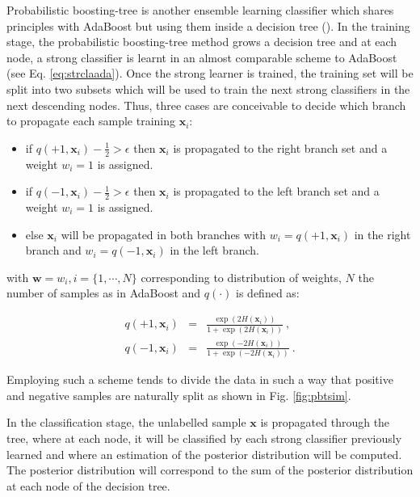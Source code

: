 \begin{enumerate}[leftmargin=*]
Probabilistic boosting-tree is another ensemble learning classifier which shares principles with AdaBoost but using them inside a decision tree (\cite{Tu2005}). In the training stage, the probabilistic boosting-tree method grows a decision tree and at each node, a strong classifier is learnt in an almost comparable scheme to AdaBoost (see Eq. \ref{eq:strclaada}). Once the strong learner is trained, the training set will be split into two subsets which will be used to train the next strong classifiers in the next descending nodes. Thus, three cases are conceivable to decide which branch to propagate each sample training $\mathbf{x}_i$:
\begin{itemize}
	\item if $q(+1, \mathbf{x}_i) - \frac{1}{2} > \epsilon$ then $\mathbf{x}_i$ is propagated to the right branch set and a weight $w_i=1$ is assigned. 
	\item if $q(-1, \mathbf{x}_i) - \frac{1}{2} > \epsilon$ then $\mathbf{x}_i$ is propagated to the left branch set and a weight $w_i=1$ is assigned.
	\item else $\mathbf{x}_i$ will be propagated in both branches with $w_i=q(+1, \mathbf{x}_i)$ in the right branch and $w_i=q(-1, \mathbf{x}_i)$ in the left branch.
\end{itemize}

\noindent with $\mathbf{w} = w_i, i=\{1,\cdots,N\}$ corresponding to distribution of weights, $N$ the number of samples as in AdaBoost and $q(\cdot)$ is defined as:

\begin{eqnarray}
	q(+1, \mathbf{x}_i) & = & \frac{\exp(2H(\mathbf{x}_i))}{1+\exp(2H(\mathbf{x}_i))} \ , \label{eq:regada1} \\
	q(-1, \mathbf{x}_i) & = & \frac{\exp(-2H(\mathbf{x}_i))}{1+\exp(-2H(\mathbf{x}_i))} \ . \label{eq:regada2}
\end{eqnarray}

Employing such a scheme tends to divide the data in such a way that positive and negative samples are naturally split as shown in Fig. \ref{fig:pbtsim}.

In the classification stage, the unlabelled sample $\mathbf{x}$ is propagated through the tree, where at each node, it will be classified by each strong classifier previously learned and where an estimation of the posterior distribution will be computed. The posterior distribution will correspond to the sum of the posterior distribution at each node of the decision tree.


\end{enumerate}
